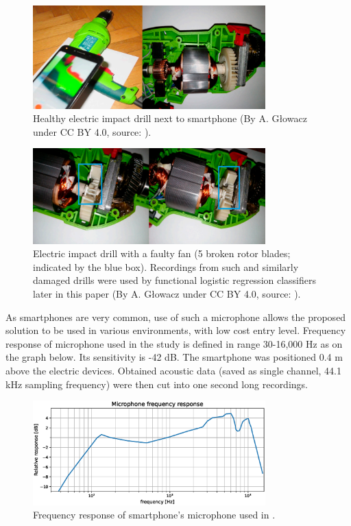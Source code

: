\documentclass[energies,article,submit,pdftex,moreauthors]{Definitions/mdpi}
\begin{document}
\vspace{5mm}
\begin{figure}[H]
\centering
\includegraphics[width=0.8\textwidth]{images/drill-healthy}
\caption{Healthy electric impact drill next to smartphone (By A. Głowacz under CC BY 4.0, source: \cite{ref-motors}).}
\end{figure}
\unskip
\vspace{5mm}

\begin{figure}[H]
\centering
\includegraphics[width=0.8\textwidth]{images/drill-broken-teeth}
\caption{Electric impact drill with a faulty fan (5 broken rotor blades; indicated by the blue box). Recordings from such and similarly damaged drills were used by functional logistic regression classifiers later in this paper (By A. Głowacz under CC BY 4.0, source: \cite{ref-motors}).}
\end{figure}
\unskip
\vspace{5mm}

As smartphones are very common, use of such a microphone allows the proposed solution to be used in various environments, with low cost entry level. Frequency response of microphone used in the study is defined in range 30-16,000 Hz as on the graph below. Its sensitivity is -42 dB. The smartphone was positioned 0.4 m above the electric devices. Obtained acoustic data (saved as single channel, 44.1 kHz sampling frequency) were then cut into one second long recordings. 

\begin{figure}[H]
\centering
\includegraphics[width=0.8\textwidth]{images/frequency-response}
\caption{Frequency response of smartphone's microphone used in \cite{ref-motors}.}
\end{figure}
\unskip
\vspace{5mm}
\end{document}
